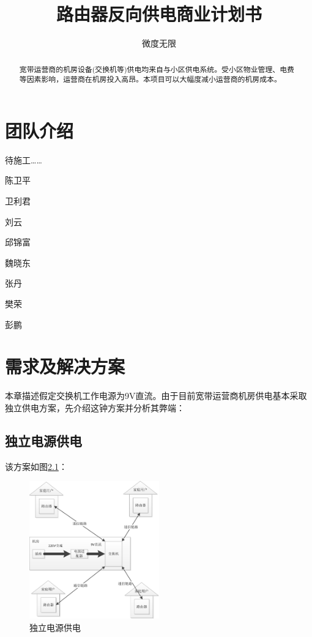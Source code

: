 \documentclass[12pt,a4paper]{report}
\title{路由器反向供电商业计划书}
\author{微度无限}
\begin{document}
\maketitle
\tableofcontents


\renewcommand{\abstractname}{摘\quad 要}
\begin{abstract}
宽带运营商的机房设备(交换机等)供电均来自与小区供电系统。受小区物业管理、电费等因素影响，运营商在机房投入高昂。本项目可以大幅度减小运营商的机房成本。
\end{abstract}

\chapter{团队介绍}
待施工……

陈卫平

卫利君

刘云

邱锦富

魏晓东

张丹

樊荣

彭鹏

\chapter{需求及解决方案}
本章描述假定交换机工作电源为9V直流。由于目前宽带运营商机房供电基本采取独立供电方案，先介绍这钟方案并分析其弊端：
\section{独立电源供电}
该方案如图\ref{独立电源供电}：
\begin{figure}
    \begin{center}
    \includegraphics[width=0.5\textwidth]{fig/传统供电.jpg}
    \caption{独立电源供电}
    \label{独立电源供电}
    \end{center}
\end{figure}
\end{document}
